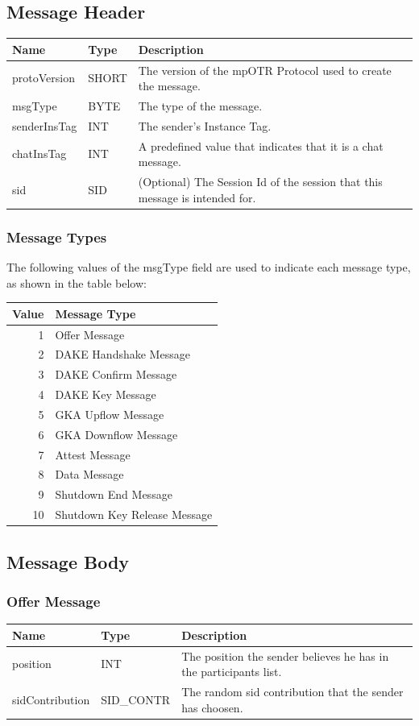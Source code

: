\documentclass[12pt,titlepage,a4paper]{article}
\begin{document}
\subsection{Message Header}

\begin{tabular}{l l l}
Name         & Type  & Description \\
\hline
protoVersion & SHORT & The version of the mpOTR Protocol used to create the message. \\
msgType      & BYTE  & The type of the message. \\
senderInsTag & INT   & The sender's Instance Tag. \\
chatInsTag   & INT   & A predefined value that indicates that it is a chat message. \\
sid          & SID   & (Optional) The Session Id of the session that this message is intended for. \\
\end{tabular}

\subsubsection{Message Types}
The following values of the msgType field are used to indicate each message type, as shown in the table below:

\begin{tabular}{r l}
Value & Message Type \\
\hline
1 & Offer Message \\
2 & DAKE Handshake Message \\
3 & DAKE Confirm Message \\
4 & DAKE Key Message \\
5 & GKA Upflow Message \\
6 & GKA Downflow Message \\
7 & Attest Message \\
8 & Data Message \\
9 & Shutdown End Message \\
10 & Shutdown Key Release Message \\
\end{tabular}

\subsection{Message Body}

\subsubsection{Offer Message}
\begin{tabular}{l l l}
Name            & Type       & Description \\
\hline
position        & INT        & The position the sender believes he has in the participants list. \\
sidContribution & SID\_CONTR & The random sid contribution that the sender has choosen. \\
\end{tabular}
\end{document}
